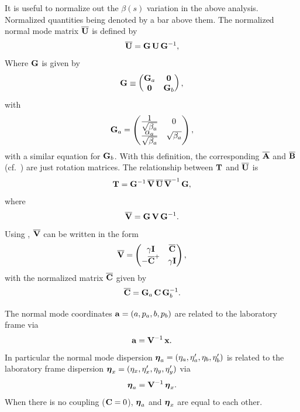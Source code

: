 It is useful to normalize out the $\beta(s)$ variation in the above analysis. Normalized quantities
being denoted by a bar above them. The normalized normal mode matrix $\overline{{\bf U}}$ is defined by
  \begin{equation}
    \overline{{\bf U}} = {\bf G} \, {\bf U} \, {\bf G}^{-1}
    , \label{ugug}
  \end{equation}
Where ${\bf G}$ is given by 
  \begin{equation}
    {\bf G} \equiv 
    \begin{pmatrix}
      {\bf G}_a & {\bf 0} \cr 
      {\bf 0} & {\bf G}_b
    \end{pmatrix}
    , \label{gg00g}
  \end{equation}  
with 
  \begin{equation}
    {\bf G}_a = 
    \begin{pmatrix}
      \frac{\textstyle 1}{\textstyle \sqrt{\beta_a}} & 0 \cr
      \frac{\textstyle \alpha_a}{\textstyle \sqrt{\beta_a}} & \sqrt{\beta_a}
    \end{pmatrix}
    , \label{g1b0a} 
  \end{equation}
with a similar equation for ${\bf G}_b$. With this definition, the corresponding $\overline{{\bf A}}$ and
$\overline{{\bf B}}$ (cf.~) are just rotation matrices. The relationship between ${\bf T}$ and
$\overline{{\bf U}}$ is
  \begin{equation}
    {\bf T} = {\bf G}^{-1} \, \overline{{\bf V}} \, \overline{{\bf U}} \, \overline{{\bf V}}^{-1} \, {\bf G}
    , \label{tgvuv}
  \end{equation}
where
  \begin{equation}
    \overline{{\bf V}} = {\bf G} \, {\bf V} \, {\bf G}^{-1}
    . \label{vgvg}
  \end{equation}
Using , $\overline{{\bf V}}$ can be written in the form
  \begin{equation}
    \overline{{\bf V}} = 
    \begin{pmatrix}
      \gamma {\bf I} & \overline{{\bf C}} \cr -\overline{{\bf C}}^+ & \gamma {\bf I}
    \end{pmatrix}
    , \label{vgicc3}
  \end{equation}
with the normalized matrix $\overline{{\bf C}}$ given by
  \begin{equation}
    \overline{{\bf C}} = {\bf G}_a \, {\bf C} \, {\bf G}_b^{-1}
    . \label{cgcg}
  \end{equation}

The normal mode coordinates ${\bf a} = (a, p_a, b, p_b)$ are related to the laboratory frame via
  \begin{equation}
    {\bf a} = {\bf V}^{-1} \, {\bf x}
    . \label{avx}
  \end{equation} 
In particular the normal mode dispersion $\boldsymbol{\eta}_a = (\eta_a, \eta'_a, \eta_b, \eta'_b)$ is related
to the laboratory frame dispersion $\boldsymbol{\eta}_x = (\eta_x, \eta'_x, \eta_y, \eta'_y)$ via
  \begin{equation}
    {\boldsymbol{\eta}_a} = {\bf V}^{-1} \, {\boldsymbol{\eta}_x}
    . \label{etaavx}
  \end{equation} 
When there is no coupling (${\bf C} = 0$), $\boldsymbol{\eta}_a$ and $\boldsymbol{\eta}_x$ are
equal to each other.

